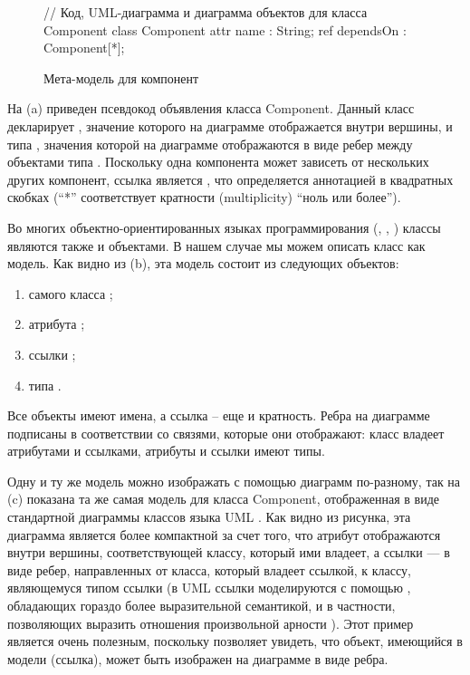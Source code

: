 \begin{figure}[htbp]
// Код, UML-диаграмма и диаграмма объектов для класса Component
class Component {
	attr name : String;
	ref dependsOn : Component[*];
}
\caption{Мета-модель для компонент}\label{ComponentClass}
\end{figure}

На  (a) приведен псевдокод объявления класса Component. Данный класс декларирует    , значение которого на диаграмме отображается внутри вершины, и   типа , значения которой на диаграмме отображаются в виде ребер между объектами типа . Поскольку одна компонента может зависеть от нескольких других компонент, ссылка  является , что определяется аннотацией в квадратных скобках (``*'' соответствует кратности (multiplicity) ``ноль или более'').

Во многих объектно-ориентированных языках программирования (, ,  \cite{SmallTalk}) классы являются также и объектами. В нашем случае мы можем описать класс  как модель. Как видно из  (b), эта модель состоит из следующих объектов: 
\begin{enumerate}
\item самого класса ;
\item атрибута ;
\item ссылки ;
\item типа .
\end{enumerate}
Все объекты имеют имена, а ссылка  -- еще и кратность.
Ребра на диаграмме подписаны в соответствии со связями, которые они отображают: класс владеет атрибутами и ссылками, атрибуты и ссылки имеют типы. 

Одну и ту же модель можно изображать с помощью диаграмм по-разному, так на  (c) показана та же самая модель для класса Component, отображенная в виде стандартной диаграммы классов языка UML \cite{UML}. Как видно из рисунка, эта диаграмма является более компактной за счет того, что атрибут отображаются внутри вершины, соответствующей классу, который ими владеет, а ссылки --- в виде ребер, направленных от класса, который владеет ссылкой, к классу, являющемуся типом ссылки (в UML ссылки моделируются с помощью , обладающих гораздо более выразительной семантикой, и в частности, позволяющих выразить отношения произвольной арности \cite{???}). Этот пример является очень полезным, поскольку позволяет увидеть, что объект, имеющийся в модели (ссылка), может быть изображен на диаграмме в виде ребра.

